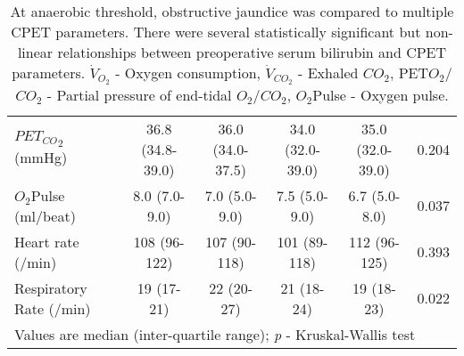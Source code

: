 \begin{sidewaystable}[p]
\begin{tabular}{|l| c c c c c|}
		${PET_{CO}}_2$ (mmHg)          & 36.8 (34.8-39.0)    & 36.0 (34.0-37.5)    & 34.0 (32.0-39.0)    & 35.0 (32.0-39.0)    & 0.204      \\
		$O_2$Pulse (ml/beat)           & 8.0 (7.0-9.0)       & 7.0 (5.0-9.0)       & 7.5 (5.0-9.0)       & 6.7 (5.0-8.0)       & 0.037      \\
		Heart rate (/min)              & 108 (96-122)        & 107 (90-118)        & 101 (89-118)        & 112 (96-125)        & 0.393      \\
		Respiratory Rate (/min)        & 19 (17-21)          & 22 (20-27)          & 21 (18-24)          & 19 (18-23)          & 0.022      \\ \hline
		\multicolumn{6}{l}{Values are median (inter-quartile range); \textit{p} - Kruskal-Wallis test}
	\end{tabular}
	\medskip
	\caption*{At anaerobic threshold, obstructive jaundice was compared to multiple CPET parameters. There were several statistically significant but non-linear relationships between preoperative serum bilirubin and CPET parameters. $\dot{V}_{O_2}$ - Oxygen consumption, $\dot{V}_{CO_2}$ - Exhaled $CO_2$, PET$O_2$/$CO_2$ - Partial pressure of end-tidal $O_2$/$CO_2$, $O_2$Pulse - Oxygen pulse.}
\end{sidewaystable}


